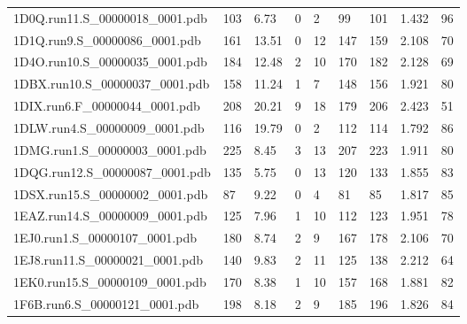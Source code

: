 \documentclass{bioinfo}
\begin{document}
\begin{table*}[!t]
{\begin{tabular}{lllllllll}
    1D0Q.run11.S\_00000018\_0001.pdb & 103      & 6.73       & 0           & 2           & 99          & 101     & 1.432           & 96           \\
    1D1Q.run9.S\_00000086\_0001.pdb & 161      & 13.51      & 0           & 12          & 147         & 159     & 2.108           & 70           \\
    1D4O.run10.S\_00000035\_0001.pdb & 184      & 12.48      & 2           & 10          & 170         & 182     & 2.128           & 69           \\
    1DBX.run10.S\_00000037\_0001.pdb & 158      & 11.24      & 1           & 7           & 148         & 156     & 1.921           & 80           \\
    1DIX.run6.F\_00000044\_0001.pdb & 208      & 20.21      & 9           & 18          & 179         & 206     & 2.423           & 51           \\
    1DLW.run4.S\_00000009\_0001.pdb & 116      & 19.79      & 0           & 2           & 112         & 114     & 1.792           & 86           \\
    1DMG.run1.S\_00000003\_0001.pdb & 225      & 8.45       & 3           & 13          & 207         & 223     & 1.911           & 80           \\
    1DQG.run12.S\_00000087\_0001.pdb & 135      & 5.75       & 0           & 13          & 120         & 133     & 1.855           & 83           \\
    1DSX.run15.S\_00000002\_0001.pdb & 87       & 9.22       & 0           & 4           & 81          & 85      & 1.817           & 85           \\
    1EAZ.run14.S\_00000009\_0001.pdb & 125      & 7.96       & 1           & 10          & 112         & 123     & 1.951           & 78           \\
    1EJ0.run1.S\_00000107\_0001.pdb & 180      & 8.74       & 2           & 9           & 167         & 178     & 2.106           & 70           \\
    1EJ8.run11.S\_00000021\_0001.pdb & 140      & 9.83       & 2           & 11          & 125         & 138     & 2.212           & 64           \\
    1EK0.run15.S\_00000109\_0001.pdb & 170      & 8.38       & 1           & 10          & 157         & 168     & 1.881           & 82           \\
    1F6B.run6.S\_00000121\_0001.pdb & 198      & 8.18       & 2           & 9           & 185         & 196     & 1.826           & 84           \\

\end{tabular}}
\end{table*}
\end{document}
